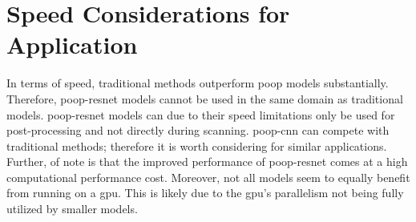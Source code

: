 \section{Speed Considerations for Application}
\label{ch:Discussion:Applications}

In terms of speed, traditional methods outperform \ac{poop} models substantially. Therefore, \ac{poop}-\ac{resnet} models cannot be used in the same domain as traditional models. \Ac{poop}-\ac{resnet} models can due to their speed limitations only be used for post-processing and not directly during scanning. \Ac{poop}-\ac{cnn} can compete with traditional methods; therefore it is worth considering for similar applications. Further, of note is that the improved performance of \Ac{poop}-\ac{resnet} comes at a high computational performance cost. Moreover, not all models seem to equally benefit from running on a \ac{gpu}. This is likely due to the \ac{gpu}'s parallelism not being fully utilized by smaller models.
